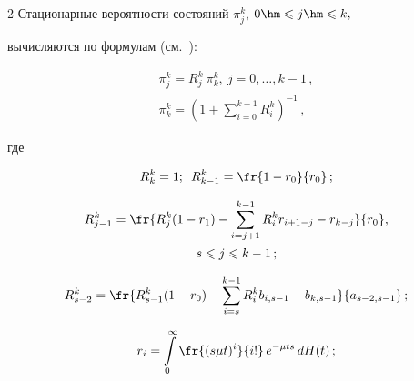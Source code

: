 \begin{multicols}{2}
Стационарные вероятности состояний  $\pi_j^k$, $0\hm\leqslant j\hm\leqslant k,$ 


вычисляются по формулам (см.~\cite{8-aga, 9-aga}):





\noindent


\begin{multline}


\label{3}


\pi_j^k=R_j^k\:\pi_k^k,\ j=0,\ldots,k-1\,,\\ \pi_k^k=


\left(1+\sum\limits_{i=0}^{k-1}R_i^k\right)^{-1}\,,


\end{multline}


где


\begin{equation*}


R_k^k=1;\enskip R_{k-1}^k=\fr{1-r_0}{r_0}\,;


\end{equation*}





\vspace*{-12pt}





\noindent


\begin{multline*}


 R_{j-1}^k=\fr{R_j^k(1-r_1)-\sum\limits_{i=j+1}^{k-1}


R_i^kr_{i+1-j}-r_{k-j}}{r_0},\\


 s\leqslant j\leqslant k-1\,;


\end{multline*}





\noindent


\begin{equation*}


R_{s-2}^k=\fr{R_{s-1}^k(1-r_0)-


\sum\limits_{i=s}^{k-1}R_i^kb_{i,s-1}-b_{k,s-1}}{a_{s-2,s-1}}\,;


\end{equation*}


\begin{equation}


 r_{i}=\int\limits_0^{\infty}\fr{(s\mu t)^i}{i!}\,e^{-\mu ts}\,dH(t)\,;



\end{equation}
\end{multicols}
